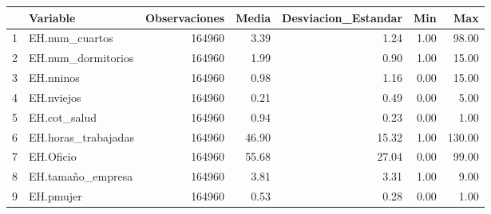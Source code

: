 \begin{table}[ht]
\centering
\begin{tabular}{rlrrrrr}
  \hline
 & Variable & Observaciones & Media & Desviacion\_Estandar & Min & Max \\ 
  \hline
1 & EH.num\_cuartos & 164960 & 3.39 & 1.24 & 1.00 & 98.00 \\ 
  2 & EH.num\_dormitorios & 164960 & 1.99 & 0.90 & 1.00 & 15.00 \\ 
  3 & EH.nninos & 164960 & 0.98 & 1.16 & 0.00 & 15.00 \\ 
  4 & EH.nviejos & 164960 & 0.21 & 0.49 & 0.00 & 5.00 \\ 
  5 & EH.cot\_salud & 164960 & 0.94 & 0.23 & 0.00 & 1.00 \\ 
  6 & EH.horas\_trabajadas & 164960 & 46.90 & 15.32 & 1.00 & 130.00 \\ 
  7 & EH.Oficio & 164960 & 55.68 & 27.04 & 0.00 & 99.00 \\ 
  8 & EH.tamaño\_empresa & 164960 & 3.81 & 3.31 & 1.00 & 9.00 \\ 
  9 & EH.pmujer & 164960 & 0.53 & 0.28 & 0.00 & 1.00 \\ 
   \hline
\end{tabular}
\end{table}

